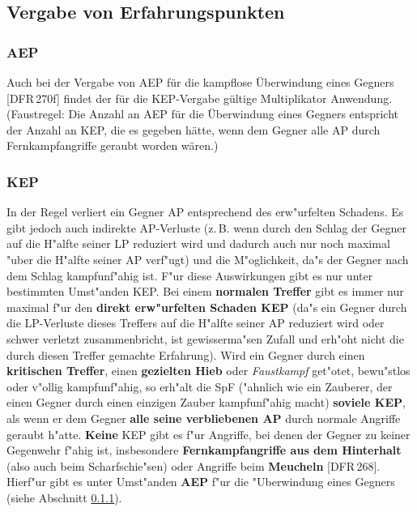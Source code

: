 \documentclass[10pt,a4paper,germanpar]{article}
\begin{document}
\subsection{Vergabe von Erfahrungspunkten}

\subsubsection{AEP}
\label{aep}

Auch bei der Vergabe von AEP für die kampflose Überwindung eines
Gegners [DFR\,270f] findet der für die KEP-Vergabe gültige
Multiplikator Anwendung. (Faustregel: Die Anzahl an AEP für die
Überwindung eines Gegners entspricht der Anzahl an KEP, die es gegeben
hätte, wenn dem Gegner alle AP durch Fernkampfangriffe geraubt worden
wären.)

\subsubsection{KEP}

In der Regel verliert ein Gegner AP entsprechend des erw"urfelten
Schadens. Es gibt jedoch auch indirekte AP-Verluste (z.\,B. wenn durch
den Schlag der Gegner auf die H"alfte seiner LP reduziert wird und
dadurch auch nur noch maximal "uber die H"alfte seiner AP verf"ugt)
und die M"oglichkeit, da"s der Gegner nach dem Schlag kampfunf"ahig
ist. F"ur diese Auswirkungen gibt es nur unter bestimmten Umst"anden
KEP. Bei einem \textbf{normalen Treffer} gibt es immer nur maximal
f"ur den \textbf{direkt erw"urfelten Schaden KEP} (da"s ein Gegner
durch die LP-Verluste dieses Treffers auf die H"alfte seiner AP
reduziert wird oder schwer verletzt zusammenbricht, ist gewisserma"sen
Zufall und erh"oht nicht die durch diesen Treffer gemachte
Erfahrung). Wird ein Gegner durch einen \textbf{kritischen Treffer},
einen \textbf{gezielten Hieb} oder \emph{Faustkampf} get"otet,
bewu"stlos oder v"ollig kampfunf"ahig, so erh"alt die SpF ("ahnlich
wie ein Zauberer, der einen Gegner durch einen einzigen Zauber
kampfunf"ahig macht) \textbf{soviele KEP}, als wenn er dem Gegner
\textbf{alle seine verbliebenen AP} durch normale Angriffe geraubt
h"atte.  \textbf{Keine} KEP gibt es f"ur Angriffe, bei denen der
Gegner zu keiner Gegenwehr f"ahig ist, insbesondere
\textbf{Fernkampfangriffe aus dem Hinterhalt} (also auch beim
Scharfschie"sen) oder Angriffe beim \textbf{Meucheln}
[DFR\,268]. Hierf"ur gibt es unter Umst"anden \textbf{AEP} f"ur die
"Uberwindung eines Gegners (siehe Abschnitt \ref{aep}).
\end{document}
